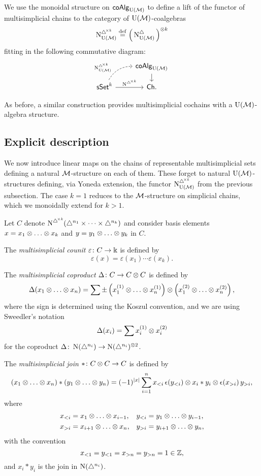 We use the monoidal structure on $\mathsf{coAlg}_{\operatorname{U}(\mathcal{M})}$ to define a lift of the functor of multisimplicial chains to the category of ${\operatorname{U}(\mathcal{M})}$-coalgebras
\[
\operatorname{\operatorname{N}^{\triangle^{\!\times\mathit{k}}}_{{\operatorname{U}(\mathcal{M})}}} \stackrel{\mathrm{def}}{=} \Big(\operatorname{N^{\triangle}_{{\operatorname{U}(\mathcal{M})}}}\Big)^{\otimes k}
\]
fitting in the following commutative diagram:
\[
\begin{tikzcd}[column sep=normal, row sep=small]
& \coAlg_\UM \arrow[d] \\
\arrow[ur, "\mchainskUM", out=60, in=180, near start, dashed]
\sSet^k \arrow[r, "\mchainsk"]
& \Ch.
\end{tikzcd}
\]

As before, a similar construction provides multisimplicial cochains with a ${\operatorname{U}(\mathcal{M})}$-algebra structure.

\subsection{Explicit description}

We now introduce linear maps on the chains of representable multisimplicial sets defining a natural $\mathcal{M}$-structure on each of them.
These forget to natural ${\operatorname{U}(\mathcal{M})}$-structures defining, via Yoneda extension, the functor $\operatorname{\operatorname{N}^{\triangle^{\!\times\mathit{k}}}_{{\operatorname{U}(\mathcal{M})}}}$ from the previous subsection.
The case $k = 1$ reduces to the $\mathcal{M}$-structure on simplicial chains, which we monoidally extend for $k > 1$.

Let $C$ denote $\operatorname{\operatorname{N}^{\triangle^{\!\times\mathit{k}}}}(\triangle^{n_1} \times \dots \times \triangle^{n_k})$ and consider basis elements $x = x_1 \ot \dots \ot x_k$ and $y = y_1 \ot \dots \ot y_k$ in $C$.

The \textit{multisimplicial counit} $\varepsilon \colon C \to \Bbbk$ is defined by
\[
\varepsilon(x) = \varepsilon(x_1) \dotsm \varepsilon(x_k).
\]

The \textit{multisimplicial coproduct} $\Delta \colon C \to C \otimes C$ is defined by
\[
\Delta (x_1 \ot \dots \ot x_n) =
\sum \pm \left( x_1^{(1)} \ot \dots \ot x_n^{(1)} \right) \ot
\left( x_1^{(2)} \ot \dots \ot x_n^{(2)} \right),
\]
where the sign is determined using the Koszul convention, and we are using Sweedler's notation
\[
\Delta(x_i) = \sum x_i^{(1)} \otimes x_i^{(2)}
\]
for the coproduct $\Delta \colon \operatorname{N}(\triangle^{n_i}) \to \operatorname{N}(\triangle^{n_i})^{\otimes 2}$.

The \textit{multisimplicial join} $\ast \colon C \otimes C \to C$ is defined by
\begin{align*}
(x_1 \ot \dots \ot x_n) \ast (y_1 \ot \dots \ot y_n) =
(-1)^{|x|} \sum_{i=1}^n x_{<i}\, \epsilon(y_{<i}) \ot x_i \ast y_i \ot \epsilon(x_{>i}) \, y_{>i},
\end{align*}
where
\begin{align*}
x_{<i} & = x_1 \ot \dots \ot x_{i-1}, &
y_{<i} & = y_1 \ot \dots \ot y_{i-1}, \\
x_{>i} & = x_{i+1} \ot \dots \ot x_n, &
y_{>i} & = y_{i+1} \ot \dots \ot y_n,
\end{align*}
with the convention
\[
x_{<1} = y_{<1} = x_{>n} = y_{>n} = 1 \in \mathbb{Z},
\]
and $x_i \ast y_i$ is the join in $\operatorname{N}(\triangle^{n_i})$.

